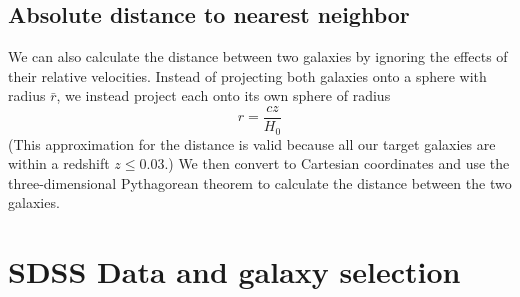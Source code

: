 \subsection{Absolute distance to nearest neighbor}

We can also calculate the distance between two galaxies by ignoring the effects 
of their relative velocities.  Instead of projecting both galaxies onto a sphere 
with radius $\bar{r}$, we instead project each onto its own sphere of radius 
\begin{equation}
    r = \frac{cz}{H_0}
\end{equation}
(This approximation for the distance is valid because all our target galaxies 
are within a redshift $z \leq 0.03$.)  We then convert to Cartesian coordinates 
and use the three-dimensional Pythagorean theorem to calculate the distance 
between the two galaxies.




\section[Data]{SDSS Data and galaxy selection}

